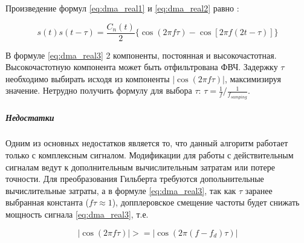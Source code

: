 Произведение формул \ref{eq:dma_real1} и \ref{eq:dma_real2} равно \cite{tsui}:
\begin{center}
\begin{equation}
	\label{eq:dma_real3}
	s(t)s(t - \tau) = \frac{C_n(t)}{2} \{\cos (2\pi f \tau) - \cos [2 \pi f (2t - \tau)]\}
\end{equation}
\end{center}

В формуле \ref{eq:dma_real3} 2 компоненты, постоянная и высокочастотная. Высокочастотную компонента
может быть отфильтрована ФВЧ. Задержку ${\tau}$ необходимо выбирать исходя из компоненты ${\left| \cos (2\pi f \tau) \right|}$,
максимизируя значение. Нетрудно получить формулу для выбора ${\tau}$: ${\tau = \frac{1}{f} / \frac{1}{f_{samping}}}$.

\subparagraph{Недостатки}

Одним из основных недостатков является то, что данный алгоритм работает только с комплексным сигналом. Модификации
для работы с действительным сигналам ведут к дополнительным вычислительным затратам или потере точности. Для
преобразования Гильберта требуются допольнительные вычислительные затраты, а в формуле \ref{eq:dma_real3}, так
как ${\tau}$ заранее выбранная константа (${f\tau \approx 1}$), допплеровское смещение частоты будет снижать мощность
сигнала \ref{eq:dma_real3}, т.е.
\begin{center}
\begin{equation}
	\left| \cos (2\pi f \tau) \right| >= \left| \cos (2\pi (f - f_d) \tau) \right|
\end{equation}
\end{center}

\newpage
